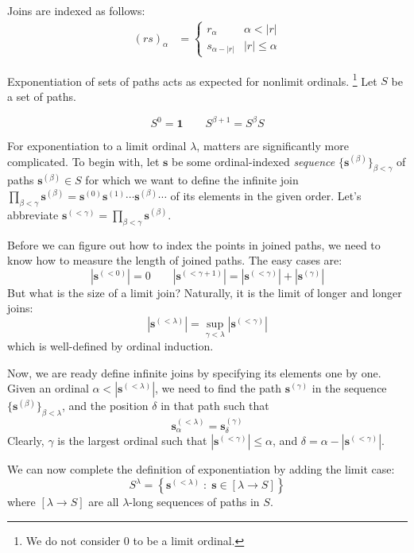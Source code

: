 \documentclass{llncs}
\newcommand{\One}{\textbf{1}}
\newcommand{\q}[2]{{\mathbf{#1}}^{(#2)}}
\newcommand{\ql}[2]{\prod_{\beta<#2}\q{#1}{\beta}}
\newcommand{\hide}[1]{}
\begin{document}
Joins are indexed as follows:
\[
\begin{array}{ll}
(rs)_\alpha & =\begin{cases}
r_\alpha & \alpha < |r|\\
s_{\alpha -  |r|} &  |r| \leq \alpha
\end{cases} 
\end{array}
\]

Exponentiation of sets of paths acts as expected for nonlimit ordinals.%
\footnote{We do not consider 0 to be a limit ordinal.}
Let $S$ be a set of paths.%

\[
S^0 = \One\qquad
S^{\beta+1} = S^\beta S
\]

For exponentiation to a limit ordinal $\lambda$, matters are significantly more complicated.
To begin with,
let $\mathbf{s}$ be some ordinal-indexed \emph{sequence} $\{\q{s}{\beta}\}_{\beta<\gamma}$  of paths $\q{s}{\beta}\in S$
for which we want to define the infinite join $\prod_{\beta<\gamma} \q{s}{\beta}= \q{s}0 \q{s}1 \cdots \q{s}\beta \cdots$ of its elements in the given order.
Let's abbreviate $\q{s}{<\gamma}=\ql{s}{\gamma}$.

Before we can figure out how to index the points in joined paths, we need to know how to measure the 
length of joined paths.
The easy cases are:
\[
\left| \q{s}{<0} \right| = 0 \qquad
\left| \q{s}{<\gamma+1} \right| = \left|  \q{s}{<\gamma} \right| + \left| \q{s}{\gamma} \right|
\]
%
But what is the size of a limit join? Naturally, it is the limit of longer and longer joins:
\[
\left| \q{s}{<\lambda} \right| = \sup_{\gamma<\lambda} \left| \q{s}{<\gamma}  \right| 
\]
which is well-defined by ordinal induction.

Now, we are ready define infinite joins by specifying its elements one
by one.  Given an ordinal $\alpha < | \q{s}{<\lambda}|$, we need to
find the path $\q{s}{\gamma}$ in the sequence
$\{\q{s}{\beta}\}_{\beta<\lambda}$, and the position $\delta$ in that
path such that
\[
\q{s}{<\lambda}_\alpha = \q{s}{\gamma}_{\delta}
\]
Clearly, $\gamma$ is the largest ordinal such that $ |\q{s}{<\gamma}|
\leq \alpha$, and $\delta= \alpha - |\q{s}{<\gamma}|$.

\hide{ as
  follows:
\[
\q{s}{<\gamma}_\alpha =
\q{s}{\beta}_{\alpha - |\q{s}{<\beta}|}
\]
where $\beta = \mathop{\mathrm{argsup}}_{\delta<\gamma} |\q{s}{<\delta}| < \alpha$
gives the path $\q{s}{\beta}$ in the sequence $\mathbf{s}$ 
containing the element of the join with index $\alpha$.
}

We can now  complete the definition of exponentiation by adding the limit case:
\[
S^\lambda = \left\{\q{s}{<\lambda}  \;\colon\; \mathbf{s} \in [\lambda\rightarrow S]\right\}
\]
where $ [\lambda\rightarrow S]$ are all $\lambda$-long sequences of paths in $S$.
\end{document}
